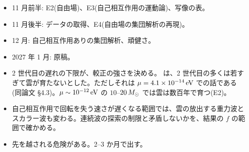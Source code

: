 \begin{itemize}
\item 11 月前半: E2(自由場)、E3(自己相互作用の運動論)、写像の表。
\item 11 月後半: データの取得、E4(自由場の集団解析の再現)。
\item 12 月: 自己相互作用ありの集団解析、頑健さ。
\item 2027 年 1 月: 原稿。
\end{itemize}

\begin{caveat}
\begin{itemize}
\item 2 世代目の遅れの下限が、較正の強さを決める。 は、2 世代目の多くは若すぎて雲が育たないとした。ただしそれは $\mu=4.1\times10^{-14}\,\mathrm{eV}$ での話である(同論文 \S4.3)。$\mu\sim10^{-12}\,\mathrm{eV}$ の $10$--$20\,M_\odot$ では雲は数百年で育つ(E2)。
\item 自己相互作用で回転を失う速さが遅くなる範囲では、雲の放出する重力波とスカラー波も変わる。連続波の探索の制限と矛盾しないかを、結果の $f$ の範囲で確かめる。
\item 先を越される危険がある。2--3 か月で出す。
\end{itemize}
\end{caveat}
